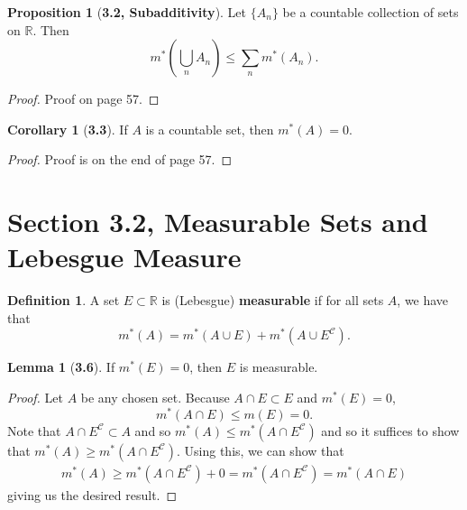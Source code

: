 \documentclass[12pt]{article}
\newcommand{\R}{\mathbb{R}}
\newcommand{\C}{\mathscr{C}}
\theoremstyle{definition}
\newtheorem*{definition}{Definition}
\newtheorem*{lemma}{Lemma}
\newtheorem*{cor}{Corollary}
\newtheorem*{prop}{Proposition}
\begin{document}
\begin{prop}[\textbf{3.2, Subadditivity}]

    Let \( \{ A_n \} \) be a countable collection of sets on \( \R \). Then 
        \[
            m^{*} \left( \bigcup_{n} A_n \right) \leq \sum_{n} m^{*}(A_n).  
        \]

    \begin{proof}
        Proof on page 57. 

    \end{proof}

    
\end{prop}

\begin{cor}[\textbf{3.3}]

    If \( A \) is a countable set, then \( m^{*}(A) = 0 \).

    \begin{proof}

        Proof is on the end of page 57. 

    \end{proof}
\end{cor}


\section*{Section 3.2, Measurable Sets and Lebesgue Measure}

\begin{definition}
    A set \( E \subset \R \) is (Lebesgue) \textbf{measurable} if for all sets \( A \), we have that
        \[
            m^{*}(A) = m^{*}(A \cup E) + m^{*}(A \cup E^{\C}).  
        \]
\end{definition}

\begin{lemma}[\textbf{3.6}]
    
    If \( m^{*}(E) = 0 \), then \( E \) is measurable. 

        \begin{proof}
            Let \( A \) be any chosen set. Because \( A \cap E \subset E \) and \( m^{*}(E) = 0 \),
                \[
                    m^{*}(A \cap E) \leq m(E) = 0.  
                \]
            Note that \( A \cap E^{\C} \subset A \) and so \( m^{*}(A) \leq m^{*}(A \cap E^{\C}) \) and so it suffices to show that
            \( m^{*}(A) \geq m^{*}(A \cap E^{\C}) \). Using this, we can show that
                \begin{align*}
                    m^{*}(A) \geq m^{*}(A \cap E^{\C}) + 0 = m^{*}(A \cap E^{\C}) = m^{*}(A \cap E)
                \end{align*}
            giving us the desired result.
        \end{proof}

\end{lemma}
\end{document}
